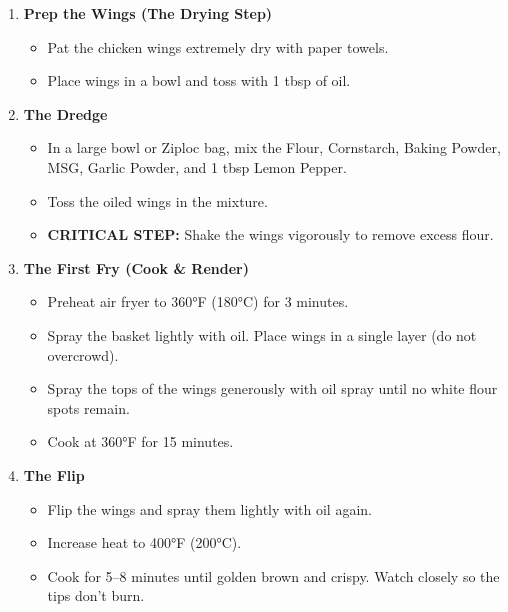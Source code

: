 \begin{enumerate}

    \item \textbf{Prep the Wings (The Drying Step)}
          \begin{itemize}[label=--]
              \item Pat the chicken wings extremely dry with paper towels.
              \item Place wings in a bowl and toss with 1 tbsp of oil.
          \end{itemize}

    \item \textbf{The Dredge}
          \begin{itemize}[label=--]
              \item In a large bowl or Ziploc bag, mix the Flour, Cornstarch, Baking Powder, MSG, Garlic Powder, and 1 tbsp Lemon Pepper.
              \item Toss the oiled wings in the mixture.
              \item \textbf{CRITICAL STEP:} Shake the wings vigorously to remove excess flour.
          \end{itemize}

    \item \textbf{The First Fry (Cook \& Render)}
          \begin{itemize}[label=--]
              \item Preheat air fryer to 360°F (180°C) for 3 minutes.
              \item Spray the basket lightly with oil. Place wings in a single layer (do not overcrowd).
              \item Spray the tops of the wings generously with oil spray until no white flour spots remain.
              \item Cook at 360°F for 15 minutes.
          \end{itemize}

    \item \textbf{The Flip}
          \begin{itemize}[label=--]
              \item Flip the wings and spray them lightly with oil again.
              \item Increase heat to 400°F (200°C).
              \item Cook for 5–8 minutes until golden brown and crispy. Watch closely so the tips don't burn.
          \end{itemize}


\end{enumerate}
